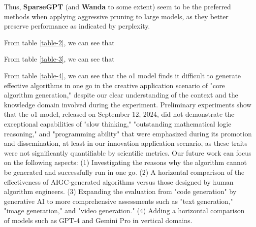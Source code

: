 \documentclass{article} %
\begin{document}
Thus, \textbf{SparseGPT} (and \textbf{Wanda} to some extent) seem to be the preferred methods when applying aggressive pruning to large models, as they better preserve performance as indicated by perplexity.

From table \ref{table-2}, we can see that

From table \ref{table-3}, we can see that

From table \ref{table-4}, we can see that the o1 model finds it difficult to generate effective algorithms in one go in the creative application scenario of "core algorithm generation," despite our clear understanding of the context and the knowledge domain involved during the experiment.
Preliminary experiments show that the o1 model, released on September 12, 2024, did not demonstrate the exceptional capabilities of "slow thinking," "outstanding mathematical logic reasoning," and "programming ability" that were emphasized during its promotion and dissemination, at least in our innovation application scenario, as these traits were not significantly quantifiable by scientific metrics.
Our future work can focus on the following aspects: (1) Investigating the reasons why the algorithm cannot be generated and successfully run in one go. (2) A horizontal comparison of the effectiveness of AIGC-generated algorithms versus those designed by human algorithm engineers. (3) Expanding the evaluation from "code generation" by generative AI to more comprehensive assessments such as "text generation," "image generation," and "video generation." (4) Adding a horizontal comparison of models such as GPT-4 and Gemini Pro in vertical domains.
\end{document}
